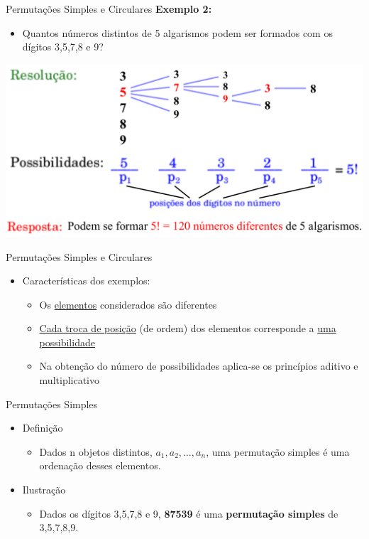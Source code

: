 \documentclass[aspectratio=169]{beamer}
\begin{document}
\begin{frame}{Permutações Simples e Circulares}
    \textbf{Exemplo 2:}

    \vspace{3mm}

    \begin{itemize}
        \item[] Quantos números distintos de 5 algarismos podem ser formados com os dígitos 3,5,7,8 e 9?
    \end{itemize}

    \begin{center}
        \includegraphics[width=0.75\linewidth]{figs/Exemplo2_12.png}
    \end{center}
\end{frame}

\begin{frame}{Permutações Simples e Circulares}
\begin{itemize}
    \item Características dos exemplos:
    \begin{itemize}
        \item Os \underline{elementos} considerados são diferentes
        \item \underline{Cada troca de posição} (de ordem) dos elementos corresponde a \underline{uma possibilidade}
        \item Na obtenção do número de possibilidades aplica-se os princípios aditivo e multiplicativo
    \end{itemize}
\end{itemize}
\end{frame}

\begin{frame}{Permutações Simples}
    \begin{itemize}
        \item Definição
        \begin{itemize}
            \item[] Dados n objetos distintos, $a_1, a_2, \ldots, a_n$, uma permutação simples é uma ordenação desses elementos.
        \end{itemize}

        \item Ilustração
        \begin{itemize}
            \item Dados os dígitos 3,5,7,8 e 9, \textbf{87539} é uma \textbf{permutação simples} de 3,5,7,8,9.
        \end{itemize}
    \end{itemize}

\end{frame}
\end{document}
